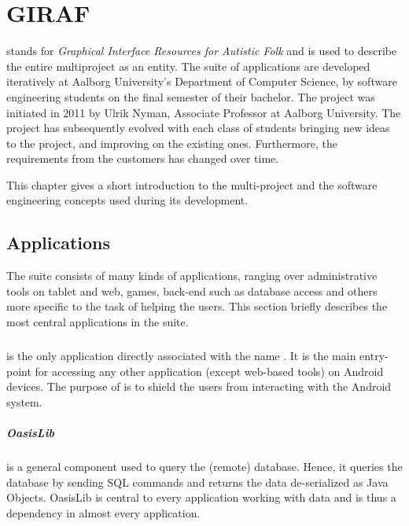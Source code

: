 \chapter{GIRAF}\label{chap:giraf}
\giraf  stands for \textit{Graphical Interface Resources for Autistic Folk} and is used to describe the entire multiproject as an entity.
The suite of \giraf applications are developed iteratively at Aalborg University's Department of Computer Science, by software engineering students on the final semester of their bachelor.
The project was initiated in 2011 by Ulrik Nyman, Associate Professor at Aalborg University.
The project has subsequently evolved with each class of students bringing new ideas to the project, and improving on the existing ones.
Furthermore, the requirements from the customers has changed over time.

This chapter gives a short introduction to the \giraf multi-project and the software engineering concepts used during its development.

\section{\giraf Applications}\label{sec:giraf:applications}
The \giraf suite consists of many kinds of applications, ranging over administrative tools on tablet and web, games, back-end such as database access and others more specific to the task of helping the users.
This section briefly describes the most central applications in the \giraf suite.

\paragraph{\launcher}
is the only application directly associated with the name \giraf.
It is the main entry-point for accessing any other application (except web-based tools) on Android devices.
The purpose of \launcher is to shield the users from interacting with the Android system.

\paragraph{OasisLib}
is a general component used to query the (remote) database.
Hence, it queries the database by sending SQL commands and returns the data de-serialized as Java Objects.
OasisLib is central to every \giraf application working with data and is thus a dependency in almost every application.


